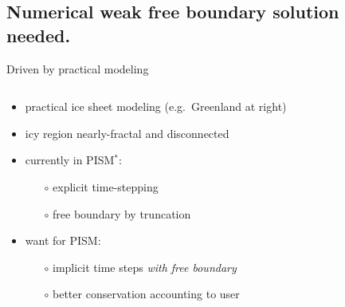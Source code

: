 \documentclass{beamer}
\begin{document}
\subsection{Numerical weak free boundary solution needed.}

\begin{frame}{Driven by practical modeling}

\begin{columns}
\begin{column}{0.5\textwidth}
\begin{itemize}
\small
\item practical ice sheet modeling (e.g.~Greenland at right)
\item icy region nearly-fractal and disconnected
\item currently in PISM$^*$:
  \begin{itemize}
  \item[$\circ$] explicit time-stepping
  \item[$\circ$] free boundary by truncation
  \end{itemize}
\item want for PISM:
  \begin{itemize}
  \item[$\circ$] implicit time steps \emph{with free boundary}
  \item[$\circ$] better conservation accounting to user
  \end{itemize}
\end{itemize}


\end{column}
\end{columns}
\end{frame}
\end{document}
